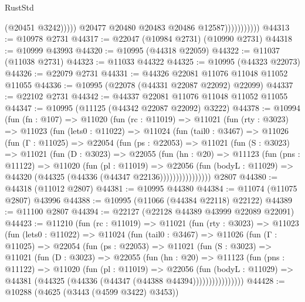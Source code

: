 \begin{lexlean}{RustStd}
\begin{coremodule}
                                  (@20451 @3242)))))
                          @20477
                          @20480
                          @20483
                          @20486
                          @12587)))))))))))
@44313 := @10978 @2731
@44317 := @22047 (@10984 @2731) (@10990 @2731)
@44318 := @10999 @43993
@44320 := @10995 (@44318 @22059)
@44322 := @11037 (@11038 @2731)
@44323 := @11033 @44322
@44325 := @10995 (@44323 @22073)
@44326 := @22079 @2731
@44331 := @44326 @22081 @11076 @11048 @11052 @11055
@44336 := @10995 (@22078 (@44331 @22087 @22092) @22099)
@44337 := @22102 @2731
@44342 := @44337 @22081 @11076 @11048 @11052 @11055
@44347 := @10995 (@11125 (@44342 @22087 @22092) @3222)
@44378 := @10994
    (fun (fn : @107) =>
    @11020
      (fun (rc : @11019) =>
      @11021
        (fun (rty : @3023) =>
        @11023
          (fun (lets0 : @11022) =>
          @11024
            (fun (tail0 : @3467) =>
            @11026
              (fun (Γ : @11025) =>
              @22054
                (fun (ps : @22053) =>
                @11021
                  (fun (S : @3023) =>
                  @11021
                    (fun (D : @3023) =>
                    @22055
                      (fun (hn : @20) =>
                      @11123
                        (fun (pns : @11122) =>
                        @11020
                          (fun (pl : @11019) =>
                          @22056
                            (fun (bodyL : @11029) =>
                            @44320 (@44325 (@44336 (@44347 @22136))))))))))))))))
    @2807
@44380 := @44318 (@11012 @2807)
@44381 := @10995 @44380
@44384 := @11074 (@11075 @2807) @43996
@44388 := @10995 (@11066 (@44384 @22118) @22122)
@44389 := @11100 @2807
@44394 := @22127 (@22128 @44389 @43999 @22089 @22091)
@44423 := @11210
    (fun (rc : @11019) =>
    @11021
      (fun (rty : @3023) =>
      @11023
        (fun (lets0 : @11022) =>
        @11024
          (fun (tail0 : @3467) =>
          @11026
            (fun (Γ : @11025) =>
            @22054
              (fun (ps : @22053) =>
              @11021
                (fun (S : @3023) =>
                @11021
                  (fun (D : @3023) =>
                  @22055
                    (fun (hn : @20) =>
                    @11123
                      (fun (pns : @11122) =>
                      @11020
                        (fun (pl : @11019) =>
                        @22056
                          (fun (bodyL : @11029) =>
                          @44381 (@44325 (@44336 (@44347 (@44388 @44394))))))))))))))))
@44428 := @10288 (@4625 (@3443 (@4599 @3422) @3453))

\end{coremodule}
\end{lexlean}
